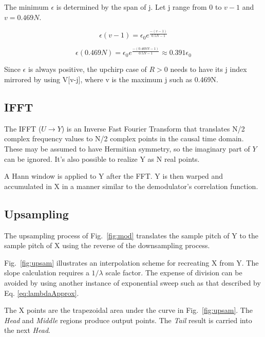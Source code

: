 The minimum $\epsilon$ is determined by the span of j.
Let j range from 0 to $v-1$ and $v = 0.469N$.

\begin{equation}
\epsilon(v-1) = \epsilon_0 e^\frac{-(v-1)}{0.5N - 1}
\end{equation}

\begin{equation}
\epsilon(0.469N) = \epsilon_0 e^\frac{-(0.469N-1)}{0.5N - 1}
\approx 0.391 \epsilon_0
\end{equation}

Since $\epsilon$ is always positive, the upchirp case of $R>0$ needs to have its
j index mirrored by using V[v-j], where v is the maximum j such as 0.469N.

\subsection{IFFT}

The IFFT ($U \rightarrow Y$) is an Inverse Fast Fourier Transform that
translates N/2 complex frequency values to N/2 complex points in the causal
time domain. These may be assumed to have Hermitian symmetry,
so the imaginary part of $Y$ can be ignored.
It's also possible to realize Y as N real points.

A Hann window is applied to Y after the FFT. Y is then warped and accumulated
in X in a manner similar to the demodulator's correlation function.

\subsection{Upsampling}

The upsampling process of Fig.~\ref{fig:mod} translates the sample pitch of
Y to the sample pitch of X using the reverse of the downsampling process.

Fig.~\ref{fig:upsam} illustrates an interpolation scheme for recreating X from Y.
The slope calculation requires a $1/\lambda$ scale factor.
The expense of division can be avoided by using another instance of exponential
sweep such as that described by Eq. \ref{eq:lambdaApprox}.

The X points are the trapezoidal area under the curve in Fig.~\ref{fig:upsam}.
The \textit{Head} and \textit{Middle} regions produce output points.
The \textit{Tail} result is carried into the next \textit{Head}.

